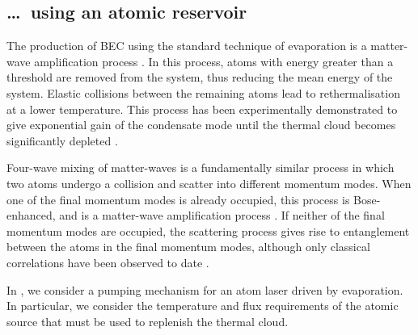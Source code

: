 \subsection{\dots\ using an atomic reservoir}

The production of BEC using the standard technique of evaporation \citep{Hess:1986,Ketterle:1996} is a matter-wave amplification process \citep{Luiten:1996,Gardiner:1997uq,Miesner:1998}.  In this process, atoms with energy greater than a threshold are removed from the system, thus reducing the mean energy of the system.  Elastic collisions between the remaining atoms lead to rethermalisation at a lower temperature.  This process has been experimentally demonstrated to give exponential gain of the condensate mode until the thermal cloud becomes significantly depleted \citep{Miesner:1998}.

Four-wave mixing of matter-waves \citep{Deng:1999qy} is a fundamentally similar process in which two atoms undergo a collision and scatter into different momentum modes.  When one of the final momentum modes is already occupied, this process is Bose-enhanced, and is a matter-wave amplification process \citep{Vogels:2002}.  If neither of the final momentum modes are occupied, the scattering process gives rise to entanglement between the atoms in the final momentum modes, although only classical correlations have been observed to date \citep{Perrin:2007}.

In , we consider a pumping mechanism for an atom laser driven by evaporation.  In particular, we consider the temperature and flux requirements of the atomic source that must be used to replenish the thermal cloud.



